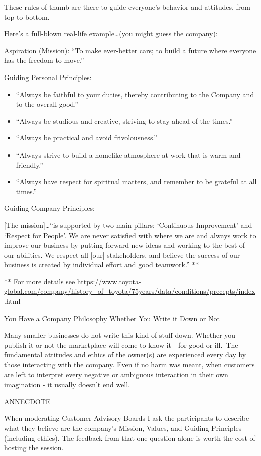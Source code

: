 \documentclass[
]{book}
\begin{document}
These rules of thumb are there to guide everyone's behavior and attitudes, from top to bottom.

Here's a full-blown real-life example\ldots(you might guess the company):

Aspiration (Mission): ``To make ever-better cars; to build a future where everyone has the freedom to move.''

Guiding Personal Principles:

\begin{itemize}
\item
  ``Always be faithful to your duties, thereby contributing to the Company and to the overall good.''
\item
  ``Always be studious and creative, striving to stay ahead of the times.''
\item
  ``Always be practical and avoid frivolousness.''
\item
  ``Always strive to build a homelike atmosphere at work that is warm and friendly.''
\item
  ``Always have respect for spiritual matters, and remember to be grateful at all times.''
\end{itemize}

Guiding Company Principles:

{[}The mission{]}\ldots{}``is supported by two main pillars: `Continuous Improvement' and `Respect for People'. We are never satisfied with where we are and always work to improve our business by putting forward new ideas and working to the best of our abilities. We respect all {[}our{]} stakeholders, and believe the success of our business is created by individual effort and good teamwork.'' **

** For more details see \url{https://www.toyota-global.com/company/history_of_toyota/75years/data/conditions/precepts/index.html}

You Have a Company Philosophy Whether You Write it Down or Not

Many smaller businesses do not write this kind of stuff down. Whether you publish it or not the marketplace will come to know it - for good or ill.~The fundamental attitudes and ethics of the owner(s) are experienced every day by those interacting with the company. Even if no harm was meant, when customers are left to interpret every negative or ambiguous interaction in their own imagination - it usually doesn't end well.

ANNECDOTE

When moderating Customer Advisory Boards I ask the participants to describe what they believe are the company's Mission, Values, and Guiding Principles (including ethics). The feedback from that one question alone is worth the cost of hosting the session.
\end{document}
